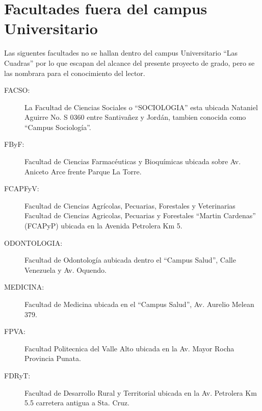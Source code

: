 \section{Facultades fuera del campus Universitario}
\label{sec:Facultades fuera del campus Universitario}

Las siguentes facultades no se hallan dentro del campus Universitario ``Las Cuadras'' por lo que escapan del alcance del presente proyecto de grado, pero se las nombrara para el conocimiento del lector.

\begin{description}
  \item[FACSO:] La Facultad de Ciencias Sociales o ``SOCIOLOGIA'' esta ubicada Nataniel Aguirre No. S 0360 entre Santivañez y Jordán, tambien conocida como ``Campus Sociología''.
  \item[FByF:] Facultad de Ciencias Farmacéuticas y Bioquímicas ubicada sobre Av. Aniceto Arce frente Parque La Torre.
  \item[FCAPFyV:] Facultad de Ciencias Agrícolas, Pecuarias, Forestales y Veterinarias
  Facultad de Ciencias Agricolas, Pecuarias y Forestales ``Martin Cardenas'' (FCAPyP) ubicada en la Avenida Petrolera Km 5.
  \item[ODONTOLOGIA:] Facultad de Odontología aubicada dentro el ``Campus Salud'', Calle Venezuela y Av. Oquendo.
  \item[MEDICINA:] Facultad de Medicina ubicada en el ``Campus Salud'', Av. Aurelio Melean 379.
  \item[FPVA:] Facultad Politecnica del Valle Alto ubicada en la Av. Mayor Rocha Provincia Punata.
  \item[FDRyT:] Facultad de Desarrollo Rural y Territorial  ubicada en la Av. Petrolera Km 5.5 carretera antigua a Sta. Cruz. 

\end{description}




%
%
%
%
%
%
%
%
%
